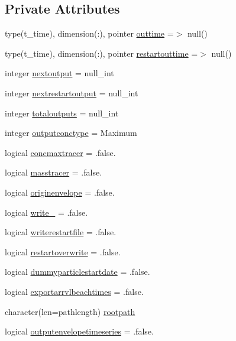\subsection*{Private Attributes}
\begin{DoxyCompactItemize}
\item 
type(t\+\_\+time), dimension(\+:), pointer \mbox{\hyperlink{structmodulelagrangianglobal_1_1t__output_a1ed83f53302d312be62c57d46ba04489}{outtime}} =$>$ null()
\item 
type(t\+\_\+time), dimension(\+:), pointer \mbox{\hyperlink{structmodulelagrangianglobal_1_1t__output_aa9044701822af19748f1b06bdcde851c}{restartouttime}} =$>$ null()
\item 
integer \mbox{\hyperlink{structmodulelagrangianglobal_1_1t__output_a33e703f40604cc4c36290e10dfa5d4a9}{nextoutput}} = null\+\_\+int
\item 
integer \mbox{\hyperlink{structmodulelagrangianglobal_1_1t__output_a53d992cc0c3e156b79e710bc7b7242b5}{nextrestartoutput}} = null\+\_\+int
\item 
integer \mbox{\hyperlink{structmodulelagrangianglobal_1_1t__output_a612d20937d03dc375283780419264b33}{totaloutputs}} = null\+\_\+int
\item 
integer \mbox{\hyperlink{structmodulelagrangianglobal_1_1t__output_a64b5aebe96cb2f5d012675a615b6147a}{outputconctype}} = Maximum
\item 
logical \mbox{\hyperlink{structmodulelagrangianglobal_1_1t__output_a53b0bebf38e38d227a05f78d5d58ad25}{concmaxtracer}} = .false.
\item 
logical \mbox{\hyperlink{structmodulelagrangianglobal_1_1t__output_a5809cf10e75daa941432174340054786}{masstracer}} = .false.
\item 
logical \mbox{\hyperlink{structmodulelagrangianglobal_1_1t__output_a57f991178b14b2c143318a3e91b97f09}{originenvelope}} = .false.
\item 
logical \mbox{\hyperlink{structmodulelagrangianglobal_1_1t__output_a231fcee787191452a4ba07b346855bf0}{write\+\_\+}} = .false.
\item 
logical \mbox{\hyperlink{structmodulelagrangianglobal_1_1t__output_a05cfaa1b0dfb39becc2bde9636d4dfe9}{writerestartfile}} = .false.
\item 
logical \mbox{\hyperlink{structmodulelagrangianglobal_1_1t__output_a24ec5b6a424ba8becb64006e42ef9776}{restartoverwrite}} = .false.
\item 
logical \mbox{\hyperlink{structmodulelagrangianglobal_1_1t__output_aac640a3e851d0aada161fbfa5a78dbbe}{dummyparticlestartdate}} = .false.
\item 
logical \mbox{\hyperlink{structmodulelagrangianglobal_1_1t__output_a93ad71f8e5f090a0cc5e75018ce2dc75}{exportarrvlbeachtimes}} = .false.
\item 
character(len=pathlength) \mbox{\hyperlink{structmodulelagrangianglobal_1_1t__output_af3defa4547bc55e37edf3a518e77103f}{rootpath}}
\item 
logical \mbox{\hyperlink{structmodulelagrangianglobal_1_1t__output_a066e0a6a4b8ddf3f4d781fe7c402377e}{outputenvelopetimeseries}} = .false.
\end{DoxyCompactItemize}


